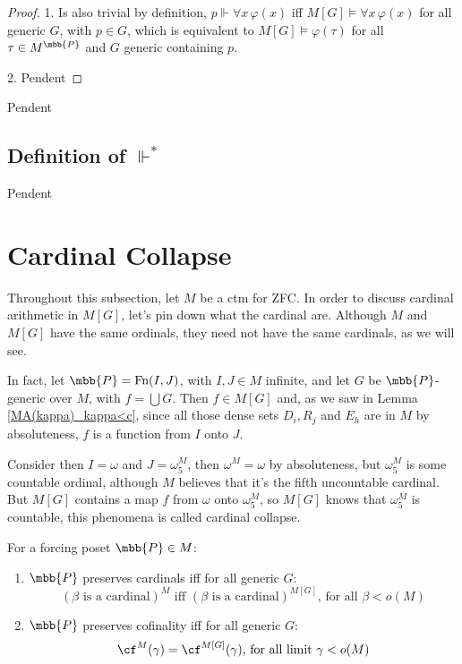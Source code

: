 \begin{proof}
    1. Is also trivial by definition, $p\Vdash\forall x\,\varphi(x)$ iff $M[G]\vDash\forall x\,\varphi(x)$ for all generic $G$, with $p\in G$, which is equivalent to $M[G]\vDash\varphi(\tau)$ for all $\tau\in M^{\mbb{P}}$ and $G$ generic containing $p$.

    2. \textcolor{laser_eyes}{Pendent}
\end{proof}



\textcolor{laser_eyes}{Pendent}

\subsection{Definition of \texorpdfstring{$\Vdash^*$}{Vdash*}}

\textcolor{laser_eyes}{Pendent}

\section{Cardinal Collapse}\label{cardinal_collapse}

Throughout this subsection, let $M$ be a ctm for ZFC. In order to discuss cardinal arithmetic in $M[G]$, let's pin down what the cardinal are. Although $M$ and $M[G]$ have the same ordinals, they need not have the same cardinals, as we will see.

In fact, let $\mbb{P}=\text{Fn}(I,J)$, with $I,J\in M$ infinite, and let $G$ be $\mbb{P}$-generic over $M$, with $f=\bigcup G$. Then $f\in M[G]$ and, as we saw in Lemma \ref{MA(kappa)_kappa<c}, since all those dense sets $D_i,R_j$ and $E_h$ are in $M$ by absoluteness, $f$ is a function from $I$ onto $J$.

Consider then $I=\omega$ and $J=\omega_5^M$, then $\omega^M=\omega$ by absoluteness, but $\omega_5^M$ is some countable ordinal, although $M$ believes that it's the fifth uncountable cardinal. But $M[G]$ contains a map $f$ from $\omega$ onto $\omega_5^M$, so $M[G]$ knows that $\omega_5^M$ is countable, this phenomena is called cardinal collapse.

\begin{definition}{}{}
    For a forcing poset $\mbb{P}\in M$:
    \begin{enumerate}
        \item $\mbb{P}$ preserves cardinals iff for all generic $G$:
        $$(\beta\text{ is a cardinal})^M\text{ iff }(\beta\text{ is a cardinal})^{M[G]}\text{, for all }\beta<o(M)$$
        \item $\mbb{P}$ preserves cofinality iff for all generic $G$:
        $$\cf^M(\gamma)=\cf^{M[G]}(\gamma)\text{, for all limit }\gamma<o(M)$$
    \end{enumerate}
\end{definition}

